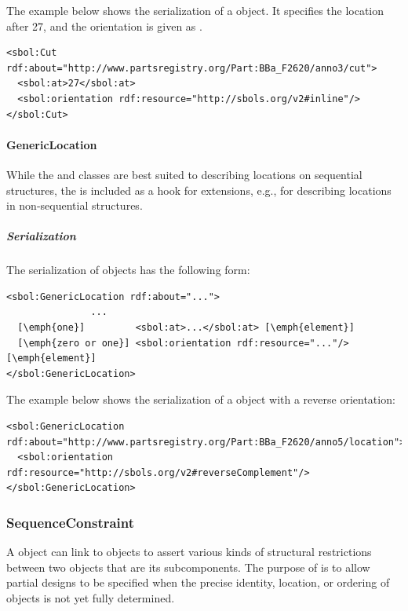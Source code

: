 The example below shows the serialization of a  object. It specifies the location after 27, and the orientation is given as .
\begin{lstlisting}
<sbol:Cut rdf:about="http://www.partsregistry.org/Part:BBa_F2620/anno3/cut">
  <sbol:at>27</sbol:at>
  <sbol:orientation rdf:resource="http://sbols.org/v2#inline"/>
</sbol:Cut>
\end{lstlisting}


\paragraph{GenericLocation}
\label{sec:GenericLocation}

While the  and  classes are best suited to
describing locations on sequential structures, the
 is included as a hook for extensions, e.g., for
describing locations in non-sequential structures.


\subparagraph{Serialization}

The serialization of  objects has the following form:
\begin{lstlisting}
<sbol:GenericLocation rdf:about="...">
               ...   
  [\emph{one}]         <sbol:at>...</sbol:at> [\emph{element}] 
  [\emph{zero or one}] <sbol:orientation rdf:resource="..."/> [\emph{element}] 
</sbol:GenericLocation>
\end{lstlisting}

The example below shows the serialization of a  object with a reverse orientation:
\begin{lstlisting}
<sbol:GenericLocation rdf:about="http://www.partsregistry.org/Part:BBa_F2620/anno5/location">
  <sbol:orientation rdf:resource="http://sbols.org/v2#reverseComplement"/>
</sbol:GenericLocation>
\end{lstlisting}

\subsubsection{SequenceConstraint}
\label{sec:SequenceConstraint}
A  object can link to  objects to assert various kinds of structural restrictions between two  objects that are its subcomponents. 
The purpose of  is to allow partial designs to be specified when the precise identity, location, or ordering of  objects is not yet fully determined.

